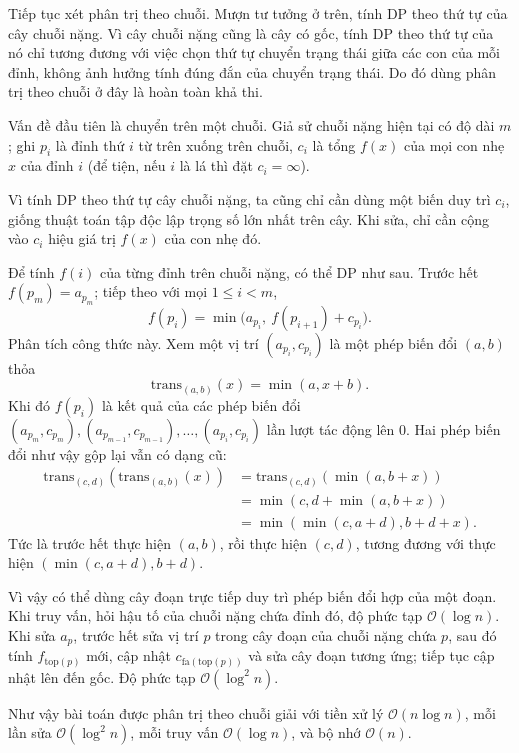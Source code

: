 \documentclass[11pt]{article}
\newcommand{\Oh}{\mathcal{O}}
\begin{document}
Tiếp tục xét phân trị theo chuỗi. Mượn tư tưởng ở trên, tính DP theo thứ tự
của cây chuỗi nặng. Vì cây chuỗi nặng cũng là cây có gốc, tính DP theo thứ tự
của nó chỉ tương đương với việc chọn thứ tự chuyển trạng thái giữa các con của
mỗi đỉnh, không ảnh hưởng tính đúng đắn của chuyển trạng thái. Do đó dùng phân
trị theo chuỗi ở đây là hoàn toàn khả thi.

Vấn đề đầu tiên là chuyển trên một chuỗi. Giả sử chuỗi nặng hiện tại có độ dài
\(m\); ghi \(p_i\) là đỉnh thứ \(i\) từ trên xuống trên chuỗi, \(c_i\) là tổng
\(f(x)\) của mọi con nhẹ \(x\) của đỉnh \(i\) (để tiện, nếu \(i\) là lá thì
đặt \(c_i=\infty\)).

Vì tính DP theo thứ tự cây chuỗi nặng, ta cũng chỉ cần dùng một biến duy trì
\(c_i\), giống thuật toán tập độc lập trọng số lớn nhất trên cây. Khi sửa, chỉ
cần cộng vào \(c_i\) hiệu giá trị \(f(x)\) của con nhẹ đó.

Để tính \(f(i)\) của từng đỉnh trên chuỗi nặng, có thể DP như sau. Trước hết
\(f(p_m)=a_{p_m}\); tiếp theo với mọi \(1\le i<m\),
\[
  f(p_i)=\min\bigl(a_{p_i},\ f(p_{i+1})+c_{p_i}\bigr).
\]
Phân tích công thức này. Xem một vị trí \((a_{p_i},c_{p_i})\) là một phép biến
đổi \((a,b)\) thỏa
\[
  \mathrm{trans}_{(a,b)}(x)=\min(a,x+b).
\]
Khi đó \(f(p_i)\) là kết quả của các phép biến đổi
\((a_{p_m},c_{p_m}), (a_{p_{m-1}},c_{p_{m-1}}),\ldots,(a_{p_i},c_{p_i})\) lần
lượt tác động lên \(0\). Hai phép biến đổi như vậy gộp lại vẫn có dạng cũ:
\[
\begin{aligned}
  \mathrm{trans}_{(c,d)}(\mathrm{trans}_{(a,b)}(x))
    &= \mathrm{trans}_{(c,d)}(\min(a,b+x))\\
    &= \min(c,d+\min(a,b+x))\\
    &= \min(\min(c,a+d),b+d+x).
\end{aligned}
\]
Tức là trước hết thực hiện \((a,b)\), rồi thực hiện \((c,d)\), tương đương với
thực hiện \((\min(c,a+d),b+d)\).

Vì vậy có thể dùng cây đoạn trực tiếp duy trì phép biến đổi hợp của một đoạn.
Khi truy vấn, hỏi hậu tố của chuỗi nặng chứa đỉnh đó, độ phức tạp
\(\Oh(\log n)\). Khi sửa \(a_p\), trước hết sửa vị trí \(p\) trong cây đoạn
của chuỗi nặng chứa \(p\), sau đó tính \(f_{\mathrm{top}(p)}\) mới, cập nhật
\(c_{\mathrm{fa}(\mathrm{top}(p))}\) và sửa cây đoạn tương ứng; tiếp tục cập
nhật lên đến gốc. Độ phức tạp \(\Oh(\log^2 n)\).

Như vậy bài toán được phân trị theo chuỗi giải với tiền xử lý
\(\Oh(n\log n)\), mỗi lần sửa \(\Oh(\log^2 n)\), mỗi truy vấn \(\Oh(\log n)\),
và bộ nhớ \(\Oh(n)\).
\end{document}
